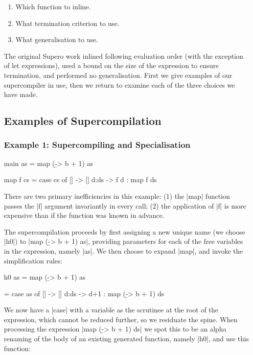 \begin{enumerate}
\item Which function to inline.
\item What termination criterion to use.
\item What generalisation to use.
\end{enumerate}

The original Supero work \cite{me:supero_ifl} inlined following evaluation order (with the exception of let expressions), used a bound on the size of the expression to ensure termination, and performed no generalisation. First we give examples of our supercompiler in use, then we return to examine each of the three choices we have made.

\subsection{Examples of Supercompilation}

\subsubsection{Example 1: Supercompiling and Specialisation}\hfill

\begin{code}
main as = map (\b -> b + 1) as

map f cs = case  cs of
                 []    -> []
                 d:ds  -> f d : map f ds
\end{code}

There are two primary inefficiencies in this example: (1) the |map| function passes the |f| argument invariantly in every call; (2) the application of |f| is more expensive than if the function was known in advance.

The supercompilation proceeds by first assigning a new unique name (we choose |h0|) to |map (\b -> b + 1) as|, providing parameters for each of the free variables in the expression, namely |as|. We then choose to expand |map|, and invoke the simplification rules:

\begin{code}
h0 as  = map (\b -> b + 1) as

       = case  as of
               []    -> []
               d:ds  -> d+1 : map (\b -> b + 1) ds
\end{code}

We now have a |case| with a variable as the scrutinee at the root of the expression, which cannot be reduced further, so we residuate the spine. When processing the expression |map (\b -> b + 1) ds| we spot this to be an alpha renaming of the body of an existing generated function, namely |h0|, and use this function:

